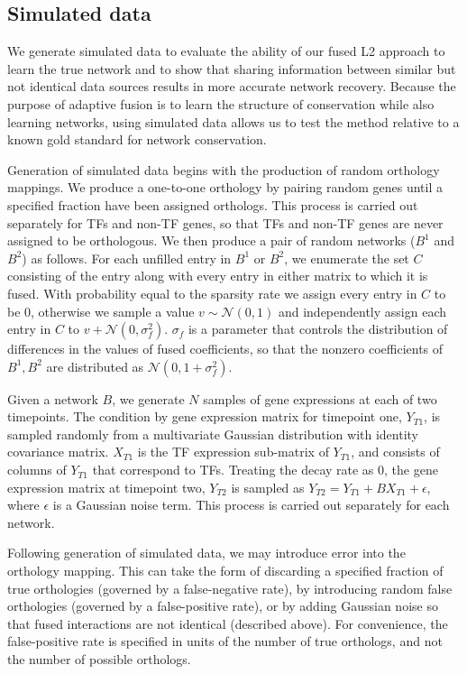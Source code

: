 \documentclass[11pt]{article}
\begin{document}
\subsection{Simulated data}
We generate simulated data to evaluate the ability of our fused L2 approach to learn the true network and to show that sharing information between similar but not identical data sources results in more accurate network recovery. Because the purpose of adaptive fusion is to learn the structure of conservation while also learning networks, using simulated data allows us to test the method relative to a known gold standard for network conservation. 


Generation of simulated data begins with the production of random orthology mappings. We produce a one-to-one orthology by pairing random genes until a specified fraction have been assigned orthologs. This process is carried out separately for TFs and non-TF genes, so that TFs and non-TF genes are never assigned to be orthologous. We then produce a pair of random networks ($B^1$ and $B^2$) as follows. For each unfilled entry in $B^1$ or $B^2$, we enumerate the set $C$ consisting of the entry along with every entry in either matrix to which it is fused. With probability equal to the sparsity rate we assign every entry in $C$ to be 0, otherwise we sample a value $v \sim \mathcal{N}(0,1)$ and independently assign each entry in $C$ to $v + \mathcal{N}(0, \sigma_f^2)$. $\sigma_f$ is a parameter that controls the distribution of differences in the values of fused coefficients, so that the nonzero coefficients of $B^1, B^2$ are distributed as $\mathcal{N}(0, 1 + \sigma_f^2)$.

Given a network $B$, we generate $N$ samples of gene expressions at each of two timepoints. The condition by gene expression matrix for timepoint one, $Y_{T1}$, is sampled randomly from a multivariate Gaussian distribution with identity covariance matrix. $X_{T1}$ is the TF expression sub-matrix of $Y_{T1}$, and consists of columns of $Y_{T1}$ that correspond to TFs. Treating the decay rate as 0, the gene expression matrix at timepoint two, $Y_{T2}$ is sampled as $Y_{T2} = Y_{T1} + BX_{T1} + \epsilon$, where $\epsilon$ is a Gaussian noise term. This process is carried out separately for each network. 

Following generation of simulated data, we may introduce error into the orthology mapping. This can take the form of discarding a specified fraction of true orthologies (governed by a false-negative rate), by introducing random false orthologies (governed by a false-positive rate), or by adding Gaussian noise so that fused interactions are not identical (described above). For convenience, the false-positive rate is specified in units of the number of true orthologs, and not the number of possible orthologs. 
\end{document}
